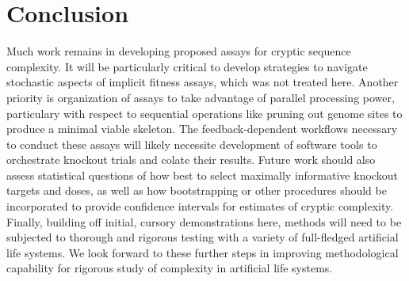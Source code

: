 \section{Conclusion} \label{sec:conclusion}

Much work remains in developing proposed assays for cryptic sequence complexity.
It will be particularly critical to develop strategies to navigate stochastic aspects of implicit fitness assays, which was not treated here.
Another priority is organization of assays to take advantage of parallel processing power, particulary with respect to sequential operations like pruning out genome sites to produce a minimal viable skeleton.
The feedback-dependent workflows necessary to conduct these assays will likely necessite development of software tools to orchestrate knockout trials and colate their results.
Future work should also assess statistical questions of how best to select maximally informative knockout targets and doses, as well as how bootstrapping or other procedures should be incorporated to provide confidence intervals for estimates of cryptic complexity.
Finally, building off initial, cursory demonstrations here, methods will need to be subjected to thorough and rigorous testing with a variety of full-fledged artificial life systems.
We look forward to these further steps in improving methodological capability for rigorous study of complexity in artificial life systems.




